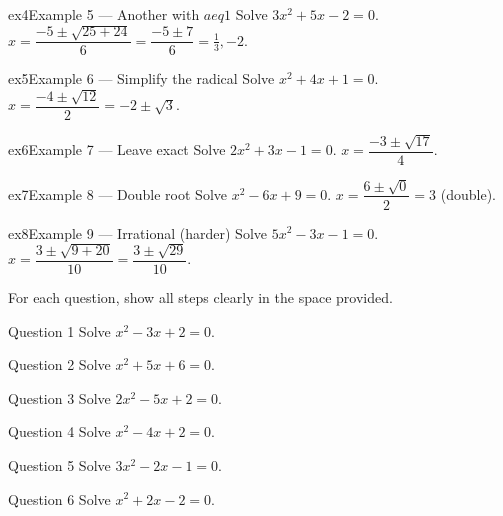 \documentclass[11pt]{article}
\begin{document}
\begin{example}{ex4}{Example 5 --- Another with $a
eq1$}
Solve $3x^2+5x-2=0$.
\soln $x=\dfrac{-5\pm\sqrt{25+24}}{6}=\dfrac{-5\pm7}{6}=\tfrac13,-2.$
\end{example}

\begin{example}{ex5}{Example 6 --- Simplify the radical}
Solve $x^2+4x+1=0$.
\soln $x=\dfrac{-4\pm\sqrt{12}}{2}=-2\pm\sqrt3.$
\end{example}

\begin{example}{ex6}{Example 7 --- Leave exact}
Solve $2x^2+3x-1=0$.
\soln $x=\dfrac{-3\pm\sqrt{17}}{4}.$
\end{example}

\begin{example}{ex7}{Example 8 --- Double root}
Solve $x^2-6x+9=0$.
\soln $x=\dfrac{6\pm\sqrt{0}}{2}=3$ (double).
\end{example}

\begin{example}{ex8}{Example 9 --- Irrational (harder)}
Solve $5x^2-3x-1=0$.
\soln $x=\dfrac{3\pm\sqrt{9+20}}{10}=\dfrac{3\pm\sqrt{29}}{10}.$
\end{example}

\clearpage
{}
For each question, show all steps clearly in the space provided.

\begin{qbox}{Question 1}
Solve $x^2-3x+2=0$.\workspace{2.2cm}
\end{qbox}

\begin{qbox}{Question 2}
Solve $x^2+5x+6=0$.\workspace{2.2cm}
\end{qbox}

\begin{qbox}{Question 3}
Solve $2x^2-5x+2=0$.\workspace{2.4cm}
\end{qbox}

\begin{qbox}{Question 4}
Solve $x^2-4x+2=0$.\workspace{2.4cm}
\end{qbox}

\begin{qbox}{Question 5}
Solve $3x^2-2x-1=0$.\workspace{2.4cm}
\end{qbox}

\begin{qbox}{Question 6}
Solve $x^2+2x-2=0$.\workspace{2.4cm}
\end{qbox}
\end{document}
